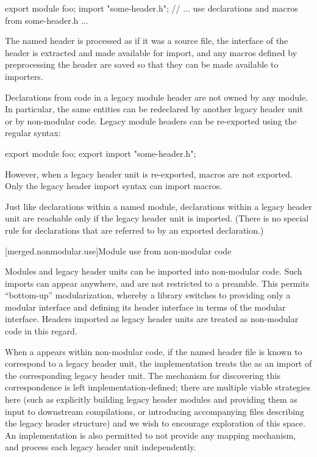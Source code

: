 \begin{codeblock}
export module foo;
import "some-header.h";
// ... use declarations and macros from some-header.h ...
\end{codeblock}

\pnum
The named header is processed as if it was a source file,
the interface of the header is extracted and made available for import,
and any macros defined by preprocessing the header are saved
so that they can be made available to importers.

\pnum
Declarations from code in a legacy module header
are not owned by any module.
In particular, the same entities can be redeclared
by another legacy header unit or by non-modular code.
Legacy module headers can be re-exported
using the regular  syntax:

\begin{codeblock}
export module foo;
export import "some-header.h";
\end{codeblock}

However, when a legacy header unit is re-exported,
macros are not exported.
Only the legacy header import syntax can import macros.

\pnum
Just like declarations within a named module,
declarations within a legacy header unit
are reachable only if the legacy header unit is imported.
(There is no special rule for declarations
that are referred to by an exported declaration.)

[merged.nonmodular.use]{Module use from non-modular code}

\pnum
Modules and legacy header units can be imported into non-modular code.
Such imports can appear anywhere, and are not restricted to a preamble.
This permits ``bottom-up'' modularization,
whereby a library switches to providing only a modular interface
and defining its header interface in terms of the modular interface.
Headers imported as legacy header units are treated as non-modular code
in this regard.

\pnum
When a  appears within non-modular code,
if the named header file is known to correspond to a legacy header unit,
the implementation treats the  as an import
of the corresponding legacy header unit.
The mechanism for discovering this correspondence
is left implementation-defined;
there are multiple viable strategies here
(such as explicitly building legacy header modules and
providing them as input to downstream compilations, or
introducing accompanying files describing the legacy header structure)
and we wish to encourage exploration of this space.
An implementation is also permitted to not provide any mapping mechanism,
and process each legacy header unit independently.

